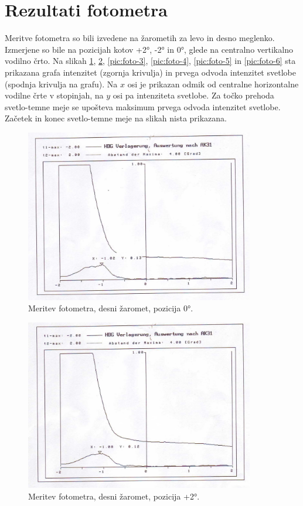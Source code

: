 \documentclass[oneside, a4paper, 12pt]{book}
\begin{document}
\section{Rezultati fotometra}
\label{ch:rf}
Meritve fotometra so bili izvedene na žarometih za levo in desno meglenko. Izmerjene so bile na pozicijah kotov +2°, -2° in 0°, glede na centralno vertikalno vodilno črto. Na slikah \ref{pic:foto-1}, \ref{pic:foto-2}, \ref{pic:foto-3}, \ref{pic:foto-4}, \ref{pic:foto-5} in \ref{pic:foto-6} sta prikazana grafa intenzitet (zgornja krivulja) in prvega odvoda intenzitet svetlobe (spodnja krivulja na grafu). Na $x$ osi je prikazan odmik od centralne horizontalne vodilne črte v stopinjah, na $y$ osi pa intenziteta svetlobe. Za točko prehoda svetlo-temne meje se upošteva maksimum prvega odvoda intenzitet svetlobe. Začetek in konec svetlo-temne meje na slikah nista prikazana.
\begin{figure}
\begin{center}
\includegraphics[width=10cm]{slike/fotometer-desni-0.jpg}
\end{center}
\caption{Meritev fotometra, desni žaromet, pozicija 0°.}
\label{pic:foto-1}
\end{figure}

\begin{figure}
\begin{center}
\includegraphics[width=10cm]{slike/fotometer-desni-+2.jpg}
\end{center}
\caption{Meritev fotometra, desni žaromet, pozicija +2°.}
\label{pic:foto-2}
\end{figure}
\end{document}
